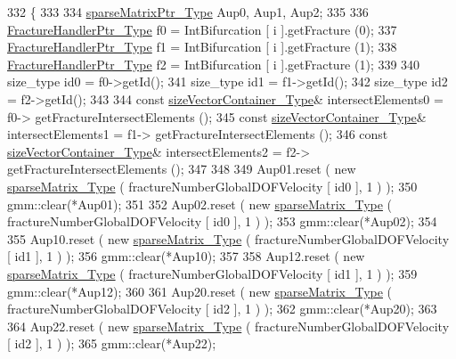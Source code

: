 \begin{DoxyCode}
332     \{
333         
334         \hyperlink{Core_8h_a87137a9501b38c724ac80bc955164bb7}{sparseMatrixPtr\_Type} Aup0, Aup1, Aup2;
335             
336         \hyperlink{FractureHandler_8h_af23fb7a30aaff864bd42587af4f1e78a}{FractureHandlerPtr\_Type} f0 = IntBifurcation [ i ].getFracture (0);
337         \hyperlink{FractureHandler_8h_af23fb7a30aaff864bd42587af4f1e78a}{FractureHandlerPtr\_Type} f1 = IntBifurcation [ i ].getFracture (1);
338         \hyperlink{FractureHandler_8h_af23fb7a30aaff864bd42587af4f1e78a}{FractureHandlerPtr\_Type} f2 = IntBifurcation [ i ].getFracture (1);
339         
340         size\_type id0 = f0->getId();
341         size\_type id1 = f1->getId();
342         size\_type id2 = f2->getId();
343         
344         \textcolor{keyword}{const} \hyperlink{Core_8h_a80e8381d86ecb0a7f4f87ff84d1a0be5}{sizeVectorContainer\_Type}& intersectElements0 =  f0->
      getFractureIntersectElements ();
345         \textcolor{keyword}{const} \hyperlink{Core_8h_a80e8381d86ecb0a7f4f87ff84d1a0be5}{sizeVectorContainer\_Type}& intersectElements1 =  f1->
      getFractureIntersectElements ();
346         \textcolor{keyword}{const} \hyperlink{Core_8h_a80e8381d86ecb0a7f4f87ff84d1a0be5}{sizeVectorContainer\_Type}& intersectElements2 =  f2->
      getFractureIntersectElements ();
347 
348         
349         Aup01.reset ( \textcolor{keyword}{new} \hyperlink{Core_8h_afba9f623673e2ae32054015bdb5500f9}{sparseMatrix\_Type} ( fractureNumberGlobalDOFVelocity [ id0 ], 1 )
       );
350         gmm::clear(*Aup01);
351 
352         Aup02.reset ( \textcolor{keyword}{new} \hyperlink{Core_8h_afba9f623673e2ae32054015bdb5500f9}{sparseMatrix\_Type} ( fractureNumberGlobalDOFVelocity [ id0 ], 1 )
       );
353         gmm::clear(*Aup02);
354 
355         Aup10.reset ( \textcolor{keyword}{new} \hyperlink{Core_8h_afba9f623673e2ae32054015bdb5500f9}{sparseMatrix\_Type} ( fractureNumberGlobalDOFVelocity [ id1 ], 1 )
       );
356         gmm::clear(*Aup10);
357 
358         Aup12.reset ( \textcolor{keyword}{new} \hyperlink{Core_8h_afba9f623673e2ae32054015bdb5500f9}{sparseMatrix\_Type} ( fractureNumberGlobalDOFVelocity [ id1 ], 1 )
       );
359         gmm::clear(*Aup12);
360 
361         Aup20.reset ( \textcolor{keyword}{new} \hyperlink{Core_8h_afba9f623673e2ae32054015bdb5500f9}{sparseMatrix\_Type} ( fractureNumberGlobalDOFVelocity [ id2 ], 1 )
       );
362         gmm::clear(*Aup20);
363 
364         Aup22.reset ( \textcolor{keyword}{new} \hyperlink{Core_8h_afba9f623673e2ae32054015bdb5500f9}{sparseMatrix\_Type} ( fractureNumberGlobalDOFVelocity [ id2 ], 1 )
       );
365         gmm::clear(*Aup22);

\end{DoxyCode}

